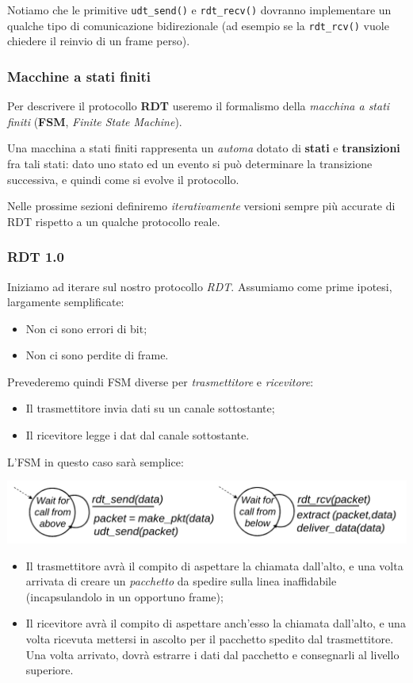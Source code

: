 \documentclass[a4paper,11pt]{article}
\begin{document}
Notiamo che le primitive \lstinline|udt_send()| e \lstinline|rdt_recv()| dovranno implementare un qualche tipo di comunicazione bidirezionale (ad esempio se la \lstinline|rdt_rcv()| vuole chiedere il reinvio di un frame perso).

\subsubsection{Macchine a stati finiti}
Per descrivere il protocollo \textbf{RDT} useremo il formalismo della \textit{macchina a stati finiti} (\textbf{FSM}, \textit{Finite State Machine}).

Una macchina a stati finiti rappresenta un \textit{automa} dotato di \textbf{stati} e \textbf{transizioni} fra tali stati: dato uno stato ed un evento si può determinare la transizione successiva, e quindi come si evolve il protocollo. 

\par\smallskip

Nelle prossime sezioni definiremo \textit{iterativamente} versioni sempre più accurate di RDT rispetto a un qualche protocollo reale.

\subsubsection{RDT 1.0}
Iniziamo ad iterare sul nostro protocollo \textit{RDT}.
Assumiamo come prime ipotesi, largamente semplificate:
\begin{itemize}
	\item Non ci sono errori di bit;
	\item Non ci sono perdite di frame.
\end{itemize}

Prevederemo quindi FSM diverse per \textit{trasmettitore} e \textit{ricevitore}:
\begin{itemize}
	\item Il trasmettitore invia dati su un canale sottostante;
	\item Il ricevitore legge i dat dal canale sottostante.
\end{itemize}

L'FSM in questo caso sarà semplice:
\begin{center}
	\includegraphics[scale=0.16]{../figures/rdt1fsm.png}
\end{center}
\begin{itemize}
	\item Il trasmettitore avrà il compito di aspettare la chiamata dall'alto, e una volta arrivata di creare un \textit{pacchetto} da spedire sulla linea inaffidabile (incapsulandolo in un opportuno frame);
	\item Il ricevitore avrà il compito di aspettare anch'esso la chiamata dall'alto, e una volta ricevuta mettersi in ascolto per il pacchetto spedito dal trasmettitore. Una volta arrivato, dovrà estrarre i dati dal pacchetto e consegnarli al livello superiore.
\end{itemize}
\end{document}
